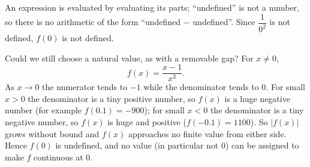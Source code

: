 An expression is evaluated by evaluating its parts; ``undefined'' is not a number, so there is no arithmetic of the form ``undefined $-$ undefined''. Since $\dfrac{1}{0^2}$ is not defined, $f(0)$ is not defined.

Could we still choose a natural value, as with a removable gap? For $x\ne0$,
\[
f(x)=\dfrac{x-1}{x^3}.
\]
As $x\to0$ the numerator tends to $-1$ while the denominator tends to $0$. For small $x>0$ the denominator is a tiny positive number, so $f(x)$ is a huge negative number (for example $f(0.1)=-900$); for small $x<0$ the denominator is a tiny negative number, so $f(x)$ is huge and positive ($f(-0.1)=1100$). So $|f(x)|$ grows without bound and $f(x)$ approaches no finite value from either side. Hence $f(0)$ is $\boxed{\text{undefined}}$, and no value (in particular not $0$) can be assigned to make $f$ continuous at $0$.
